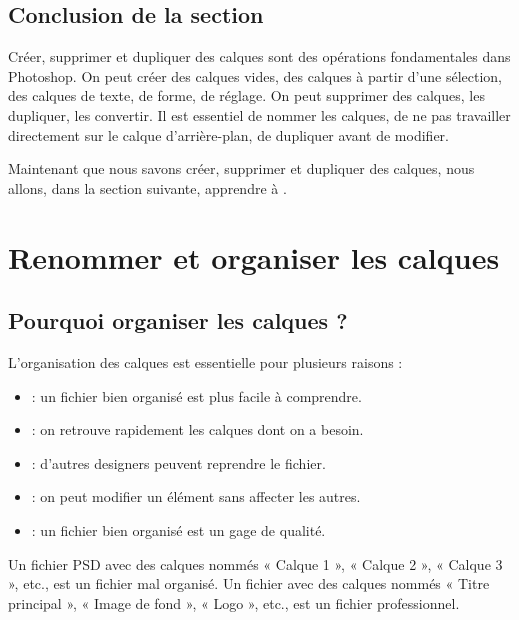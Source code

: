 \subsection*{Conclusion de la section}

Créer, supprimer et dupliquer des calques sont des opérations fondamentales dans Photoshop. On peut créer des calques vides, des calques à partir d'une sélection, des calques de texte, de forme, de réglage. On peut supprimer des calques, les dupliquer, les convertir. Il est essentiel de nommer les calques, de ne pas travailler directement sur le calque d'arrière-plan, de dupliquer avant de modifier.

Maintenant que nous savons créer, supprimer et dupliquer des calques, nous allons, dans la section suivante, apprendre à .

\section{Renommer et organiser les calques}

\subsection{Pourquoi organiser les calques ?}

L'organisation des calques est essentielle pour plusieurs raisons :

\begin{itemize}
    \item {} : un fichier bien organisé est plus facile à comprendre.
    \item {} : on retrouve rapidement les calques dont on a besoin.
    \item {} : d'autres designers peuvent reprendre le fichier.
    \item {} : on peut modifier un élément sans affecter les autres.
    \item {} : un fichier bien organisé est un gage de qualité.
\end{itemize}

Un fichier PSD avec des calques nommés « Calque 1 », « Calque 2 », « Calque 3 », etc., est un fichier mal organisé. Un fichier avec des calques nommés « Titre principal », « Image de fond », « Logo », etc., est un fichier professionnel.

